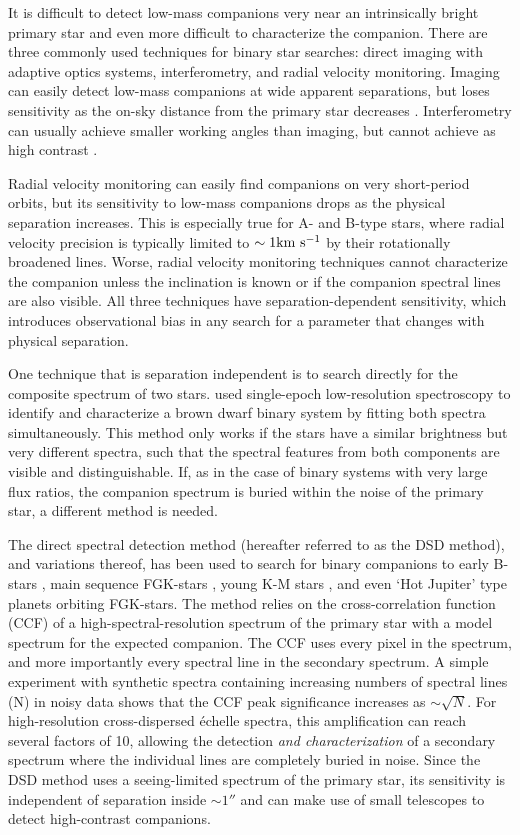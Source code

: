 \documentclass{emulateapj}
\begin{document}
It is difficult to detect low-mass companions very near an intrinsically bright primary star and even more difficult to characterize the companion. There are three commonly used techniques for binary star searches: direct imaging with adaptive optics systems,  interferometry, and radial velocity monitoring. Imaging can easily detect low-mass companions at wide apparent separations, but loses sensitivity as the on-sky distance from the primary star decreases \citep[see][for typical sensitivity curves]{DeRosa2014}. Interferometry can usually achieve smaller working angles than imaging, but cannot achieve as high contrast \citep[see e.g.][]{Aldoretta2015}.

 Radial velocity monitoring can easily find companions on very short-period orbits, but its sensitivity to low-mass companions drops as the physical separation increases. This is especially true for A- and B-type stars, where radial velocity precision is typically limited to $\sim 1 \rm km \  s^{-1}$ by their rotationally broadened lines. Worse, radial velocity monitoring techniques cannot characterize the companion unless the inclination is known or if the companion spectral lines are also visible. All three techniques have separation-dependent sensitivity, which introduces observational bias in any search for a parameter that changes with physical separation.
 
 One technique that is separation independent is to search directly for the composite spectrum of two stars. \citet{Burgasser2007} used single-epoch low-resolution spectroscopy to identify and characterize a brown dwarf binary system by fitting both spectra simultaneously. This method only works if the stars have a similar brightness but very different spectra, such that the spectral features from both components are visible and distinguishable. If, as in the case of binary systems with very large flux ratios, the companion spectrum is buried within the noise of the primary star, a different method is needed.
 
The direct spectral detection method (hereafter referred to as the DSD method), and variations thereof, has been used to search for binary companions to early B-stars \citep{Gullikson2013}, main sequence FGK-stars \citep{Kolbl2015}, young K-M stars \citep{Prato2002}, and even `Hot Jupiter' type planets \citep{Snellen2010, Brogi2012, deKok2013} orbiting FGK-stars. The method relies on the cross-correlation function (CCF) of a high-spectral-resolution spectrum of the primary star with a model spectrum for the expected companion. The CCF uses every pixel in the spectrum, and more importantly every spectral line in the secondary spectrum. A simple experiment with synthetic spectra containing increasing numbers of spectral lines (N) in noisy data shows that the CCF peak significance increases as $\sim\sqrt{N}$. For high-resolution cross-dispersed \'echelle spectra, this amplification can reach several factors of 10, allowing the detection \emph{and characterization} of a secondary spectrum where the individual lines are completely buried in noise. Since the DSD method uses a seeing-limited spectrum of the primary star, its sensitivity is independent of separation inside $\sim 1 ''$ and can make use of small telescopes to detect high-contrast companions.
\end{document}
